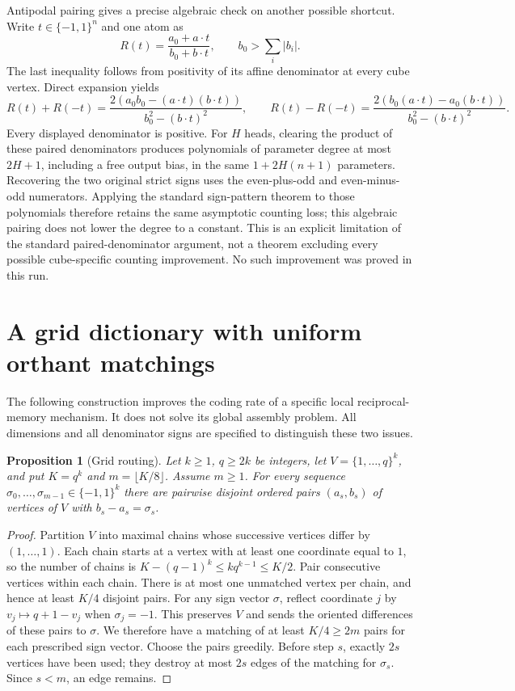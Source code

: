 \documentclass[11pt]{article}
\newtheorem{proposition}[theorem]{Proposition}
\begin{document}
Antipodal pairing gives a precise algebraic check on another possible
shortcut. Write $t\in\{-1,1\}^n$ and one atom as
\[
 R(t)=\frac{a_0+a\cdot t}{b_0+b\cdot t},
 \qquad b_0>\sum_i|b_i|.
\]
The last inequality follows from positivity of its affine denominator
at every cube vertex. Direct expansion yields
\[
 R(t)+R(-t)=
 \frac{2(a_0b_0-(a\cdot t)(b\cdot t))}
      {b_0^2-(b\cdot t)^2},
 \qquad
 R(t)-R(-t)=
 \frac{2(b_0(a\cdot t)-a_0(b\cdot t))}
      {b_0^2-(b\cdot t)^2}.
\]
Every displayed denominator is positive. For $H$ heads, clearing the
product of these paired denominators produces polynomials of parameter
degree at most $2H+1$, including a free output bias, in the same
$1+2H(n+1)$ parameters. Recovering the two original strict signs uses
the even-plus-odd and even-minus-odd numerators. Applying the standard
sign-pattern theorem to those polynomials therefore retains the same
asymptotic counting loss; this algebraic pairing does not lower the
degree to a constant. This is an explicit limitation of the standard
paired-denominator argument, not a theorem excluding every possible
cube-specific counting improvement. No such improvement was proved
in this run.

\section{A grid dictionary with uniform orthant matchings}

The following construction improves the coding rate of a specific
local reciprocal-memory mechanism. It does not solve its global
assembly problem. All dimensions and all denominator signs are
specified to distinguish these two issues.

\begin{proposition}[Grid routing]\label{prop:grid-routing}
Let $k\geq1$, $q\geq2k$ be integers, let $V=\{1,\ldots,q\}^k$,
and put $K=q^k$ and $m=\lfloor K/8\rfloor$. Assume $m\geq1$.
For every sequence $\sigma_0,\ldots,\sigma_{m-1}\in\{-1,1\}^k$
there are pairwise disjoint ordered pairs $(a_s,b_s)$ of vertices
of $V$ with $b_s-a_s=\sigma_s$.
\end{proposition}

\begin{proof}
Partition $V$ into maximal chains whose successive vertices differ
by $(1,\ldots,1)$. Each chain starts at a vertex with at least one
coordinate equal to $1$, so the number of chains is
$K-(q-1)^k\leq kq^{k-1}\leq K/2$.
Pair consecutive vertices within each chain. There is at most one
unmatched vertex per chain, and hence at least $K/4$ disjoint pairs.
For any sign vector $\sigma$, reflect coordinate $j$ by
$v_j\mapsto q+1-v_j$ when $\sigma_j=-1$. This preserves $V$ and
sends the oriented differences of these pairs to $\sigma$.
We therefore have a matching of at least $K/4\geq2m$ pairs for each
prescribed sign vector. Choose the pairs greedily. Before step $s$,
exactly $2s$ vertices have been used; they destroy at most $2s$
edges of the matching for $\sigma_s$. Since $s<m$, an edge remains.
\end{proof}
\end{document}
